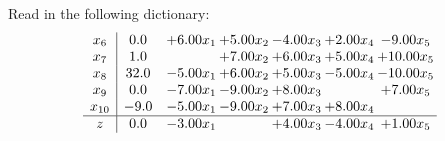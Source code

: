 \documentclass[9pt]{article}
\begin{document}
Read in the following dictionary:
\[\begin{array}{c| c c@{\hskip 2pt} c@{\hskip 2pt} c@{\hskip 2pt} c@{\hskip 2pt} c@{\hskip 2pt} }
 x_{6}   &  0.0 & +  6.00 x_{1} & +  5.00 x_{2} & -4.00 x_{3} & +  2.00 x_{4} & -9.00 x_{5}\\
 x_{7}   &  1.0  &   & +  7.00 x_{2} & +  6.00 x_{3} & +  5.00 x_{4} & + 10.00 x_{5}\\
 x_{8}   &  32.0 & -5.00 x_{1} & +  6.00 x_{2} & +  5.00 x_{3} & -5.00 x_{4} & -10.00 x_{5}\\
 x_{9}   &  0.0 & -7.00 x_{1} & -9.00 x_{2} & +  8.00 x_{3} &   & +  7.00 x_{5}\\
 x_{10}   &  -9.0 & -5.00 x_{1} & -9.00 x_{2} & +  7.00 x_{3} & +  8.00 x_{4} &   \\
\hline
z    &  0.0 & -3.00 x_{1} &   & +  4.00 x_{3} & -4.00 x_{4} & +  1.00 x_{5}\\
\end{array}\]
\end{document}
